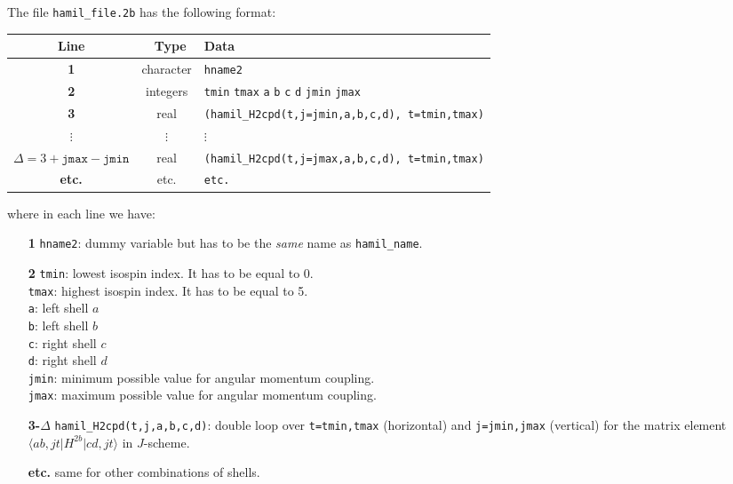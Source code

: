\documentclass[a4paper,11pt]{article}
\renewcommand{\tt}[1]{\texttt{#1}}
\newcommand{\bra}[1]{\langle #1 \vert}
\newcommand{\ket}[1]{\vert #1 \rangle}
\newcommand{\elma}[3]{\bra{#1} #2 \ket{#3}}
\begin{document}
The file \tt{hamil\_file.2b} has the following format:
\begin{center}
\begin{tabular}{|c|c|l|}
\hline
Line & \ Type \hfill & Data \\
\hline
\textbf{1}   & character       & \tt{hname2} \\
\textbf{2}   & integers        & \tt{tmin} \:\tt{tmax} \:\tt{a} \:\tt{b} \:\tt{c} \:\tt{d} \:\tt{jmin} \:\tt{jmax} \\
\textbf{3}   & real            & \tt{(hamil\_H2cpd(t,j=jmin,a,b,c,d), t=tmin,tmax)} \\
$\vdots$     &   $\vdots$      &             \phantom{000000000000} $\vdots$ \\
\textbf{$\Delta = 3+\tt{jmax}-\tt{jmin}$}  & real   & \tt{(hamil\_H2cpd(t,j=jmax,a,b,c,d), t=tmin,tmax)} \\
  \textbf{etc.}       &     etc.        &        \phantom{00000000000}\tt{etc.}  \\
\hline
\end{tabular}
\end{center}
where in each line we have:
\begin{itemize}
\item[\textbf{1}] \tt{hname2}: dummy variable but has to be the \emph{same} name as \tt{hamil\_name}.
\item[\textbf{2}] \tt{tmin}: lowest isospin index. It has to be equal to 0. \\
                  \tt{tmax}: highest isospin index. It has to be equal to 5. \\
                  \tt{a}: left  shell $a$ \\
                  \tt{b}: left  shell $b$ \\
                  \tt{c}: right shell $c$ \\
                  \tt{d}: right shell $d$ \\
                  \tt{jmin}: minimum possible value for angular momentum coupling. \\
                  \tt{jmax}: maximum possible value for angular momentum coupling. 
\item[\textbf{3-$\Delta$}] \tt{hamil\_H2cpd(t,j,a,b,c,d)}: double loop over \tt{t=tmin,tmax} (horizontal) and \tt{j=jmin,jmax} (vertical) for the
                  matrix element $\elma{ab,jt}{H^{2b}}{cd,jt}$ in $J$-scheme. 
\item[\textbf{etc.}] same for other combinations of shells.
\end{itemize}
\end{document}
